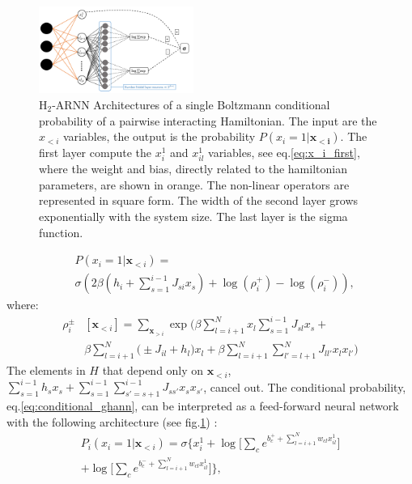 \documentclass[aps,physrev,10pt,floatfix,reprint]{revtex4-2}
\begin{document}
\begin{figure}[!ht]
    \includegraphics[width=0.45\textwidth]{img/h2ARNN.pdf}
    \caption{H$_2$-ARNN Architectures of a single Boltzmann conditional probability of a pairwise interacting Hamiltonian. The input are the $x_{<i}$ variables, the output is the probability $P(x_i=1 | \mathbf{x_{<i}})$. The first layer compute the $x^1_i$ and $x^1_{il}$ variables, see eq.\ref{eq:x_i_first}, where the weight and bias, directly related to the hamiltonian parameters, are shown in orange. The non-linear operators are represented in square form. The width of the second layer grows exponentially with the system size. The last layer is the sigma function.}
    \label{fig:arch}
\end{figure}
\begin{equation}
    \label{eq:conditional_ghann}
    \begin{split}
    & P\left(x_{i}=1|\mathbf{x}_{<i}\right) = \\
    & \sigma\left( 2 \beta \left(h_i + \sum_{s=1}^{i-1} J_{si} x_s\right) +\log(\rho_i^+) - \log(\rho_i^-)
    \right),   
    \end{split}
\end{equation}
where:
\begin{equation}
    \begin{split}
    \rho_i^{\pm}&[\mathbf{x}_{<i}]  = \sum_{\mathbf{x}_{>i}}  \exp \bigg(
    \beta\sum_{l=i+1}^{N} x_l \sum_{s=1}^{i-1} J_{sl} x_s +\\
    &\beta\sum_{l=i+1}^{N}\big( \pm J_{il}  + h_l \big) x_l 
    + \beta\sum_{l=i+1}^{N}\sum_{l'=l+1}^{N} J_{ll'} x_l x_{l'} \bigg)
\end{split}
\label{eq:rho_ghann}
\end{equation}
The elements in $H$ that depend only on $\mathbf{x}_{<i}$, $\sum_{s=1}^{i-1} h_s x_s + \sum_{s=1}^{i-1}\sum_{s'=s+1}^{i-1} J_{ss'} x_{s} x_{s'}$, cancel out.
The conditional probability, eq.\ref{eq:conditional_ghann}, can be interpreted as a feed-forward neural network with the following architecture (see fig.\ref{fig:arch}) :
\begin{multline}
        P_i\left(x_i=1 | \mathbf{x}_{<i}\right) = 
     \sigma \bigg\{ x_i^1+ 
     \log\big[ \sum_{c} e^{b_c^+ + \sum_{l=i+1}^{N} w_{cl} x_{il}^1}\big]\\
     +\log\big[ \sum_{c} e^{b_c^- + \sum_{l=i+1}^{N} w_{cl} x_{il}^1}\big] \bigg\},
\end{multline}
\end{document}
